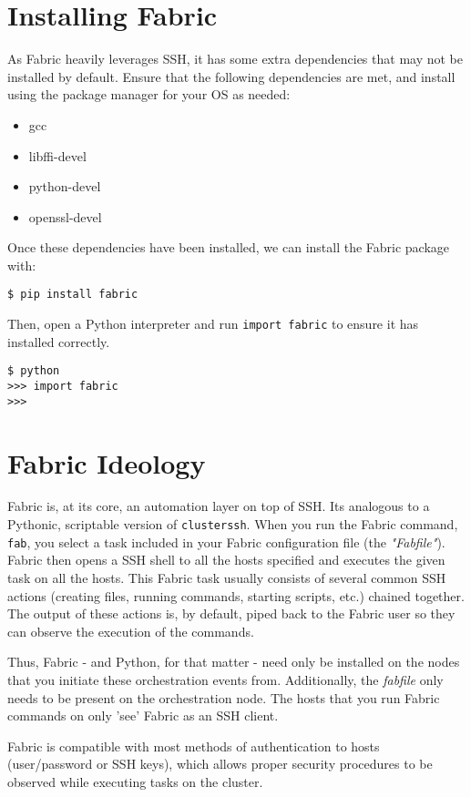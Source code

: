 \documentclass[9pt,twocolumn,twoside]{idsi}
\begin{document}
\section{Installing Fabric}
As Fabric heavily leverages SSH, it has some extra dependencies that may not be installed by default. Ensure that the following dependencies are met, and install using the package manager for your OS as needed:
\begin{itemize}
  \item gcc
  \item libffi-devel
  \item python-devel
  \item openssl-devel
\end{itemize}

Once these dependencies have been installed, we can install the Fabric package with: 
\begin{verbatim}
$ pip install fabric
\end{verbatim}
Then, open a Python interpreter and run \texttt{import fabric} to ensure it has installed correctly.

\begin{verbatim}
$ python
>>> import fabric
>>> 
\end{verbatim}

\section{Fabric Ideology}
Fabric is, at its core, an automation layer on top of SSH. Its analogous to a Pythonic, scriptable version of \texttt{clusterssh}. When you run the Fabric command, \texttt{fab}, you select a task included in your Fabric configuration file (the \emph{"Fabfile"}). Fabric then opens a SSH shell to all the hosts specified and executes the given task on all the hosts. This Fabric task usually consists of several common SSH actions (creating files, running commands, starting scripts, etc.) chained together. The output of these actions is, by default, piped back to the Fabric user so they can observe the execution of the commands.

Thus, Fabric - and Python, for that matter - need only be installed on the nodes that you initiate these orchestration events from. Additionally, the \emph{fabfile} only needs to be present on the orchestration node. The hosts that you run Fabric commands on only 'see' Fabric as an SSH client.

Fabric is compatible with most methods of authentication to hosts (user/password or SSH keys), which allows proper security procedures to be observed while executing tasks on the cluster.
\end{document}
